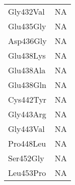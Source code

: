 \begin{tiny}
\begin{longtable}[l]{l|l}
	Gly432Val & NA \\
	Glu435Gly & NA \\
	Asp436Gly & NA \\
	Glu438Lys & NA \\
	Glu438Ala & NA \\
	Glu438Gln & NA \\
	Cys442Tyr & NA \\
	Gly443Arg & NA \\
	Gly443Val & NA \\
	Pro448Leu & NA \\
	Ser452Gly & NA \\
	Leu453Pro & NA \\
\end{longtable}
\end{tiny}